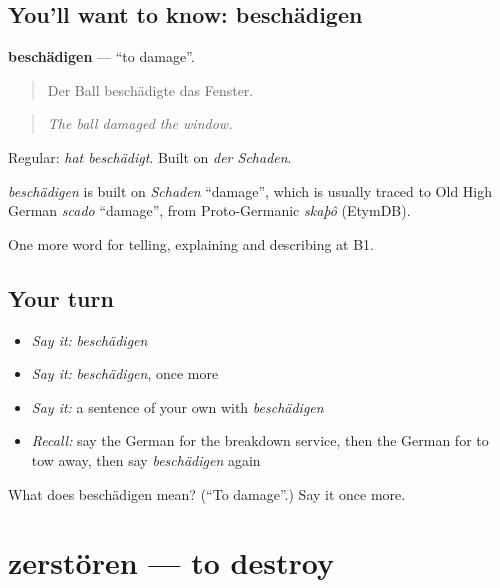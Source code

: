 \subsection*{You'll want to know: beschädigen}
\textbf{beschädigen} — \textquotedblleft{}to damage\textquotedblright{}.

\begin{quote}
Der Ball beschädigte das Fenster.
\end{quote}

\begin{quote}
\emph{The ball damaged the window.}
\end{quote}

Regular: \emph{hat beschädigt}. Built on \emph{der Schaden}.

\begin{cousinweb}
\emph{beschädigen} is built on \emph{Schaden} \textquotedblleft{}damage\textquotedblright{}, which is usually traced to Old High German \emph{scado} \textquotedblleft{}damage\textquotedblright{}, from Proto-Germanic \emph{skaþô} (EtymDB).
\end{cousinweb}

\begin{grammarlens}[title={What you've built}]
One more word for telling, explaining and describing at B1.
\end{grammarlens}

\subsection*{Your turn}
\begin{itemize}
\raggedright
  \item \emph{Say it:} \emph{beschädigen}
  \item \emph{Say it:} \emph{beschädigen}, once more
  \item \emph{Say it:} a sentence of your own with \emph{beschädigen}
  \item \emph{Recall:} say the German for the breakdown service, then the German for to tow away, then say \emph{beschädigen} again
\end{itemize}

\begin{tcolorbox}[breakable,colback=teal!4,colframe=teal!35!black,title={Before you move on}]
What does beschädigen mean? (\textquotedblleft{}To damage\textquotedblright{}.) Say it once more.
\end{tcolorbox}
\section[zerstören]{zerstören — to destroy}

